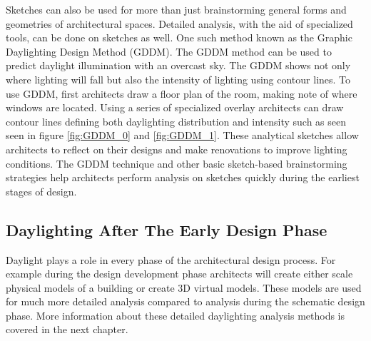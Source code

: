   Sketches can also be used for more than just brainstorming general forms and geometries of architectural spaces. 
  Detailed analysis, with the aid of specialized tools, can be done on sketches as well.
  One such method known as the Graphic Daylighting Design Method (GDDM)\cite{millet1980graphic,moore}.
  The GDDM method can be used to predict daylight illumination with an overcast sky.
  The GDDM shows not only where lighting will fall but also the intensity of lighting using contour lines.
  To use GDDM, first architects draw a floor plan of the room, making note of where windows are located.
  Using a series of specialized overlay architects can draw contour lines defining both daylighting distribution and intensity such as seen seen in figure \ref{fig:GDDM_0} and \ref{fig:GDDM_1}.
  These analytical sketches allow architects to reflect on their designs and make renovations to improve lighting conditions.
  The GDDM technique and other basic sketch-based brainstorming strategies help architects perform analysis on sketches quickly during the earliest stages of design.




  \subsection{Daylighting After The Early Design Phase}
  Daylight plays a role in every phase of the architectural design process.
  For example during the design development phase architects will create either scale physical models of a building or create 3D virtual models.
  These models are used for much more detailed analysis compared to analysis during the schematic design phase.
  More information about these detailed daylighting analysis methods is covered in the next chapter.



